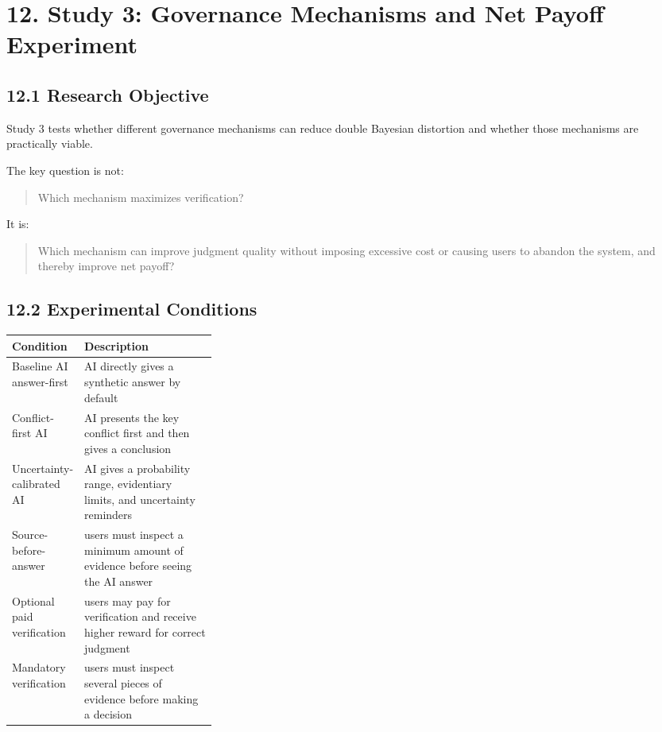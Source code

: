 \section*{12. Study 3: Governance Mechanisms and Net Payoff Experiment}

\subsection*{12.1 Research Objective}

Study 3 tests whether different governance mechanisms can reduce double Bayesian distortion and whether those mechanisms are practically viable.

The key question is not:
\begin{quote}
Which mechanism maximizes verification?
\end{quote}

It is:
\begin{quote}
Which mechanism can improve judgment quality without imposing excessive cost or causing users to abandon the system, and thereby improve net payoff?
\end{quote}

\subsection*{12.2 Experimental Conditions}

\begin{center}
\begin{tabularx}{\linewidth}{>{\raggedright\arraybackslash}p{0.3\linewidth} >{\raggedright\arraybackslash}X}
\toprule
\textbf{Condition} & \textbf{Description} \\
\midrule
Baseline AI answer-first & AI directly gives a synthetic answer by default \\
Conflict-first AI & AI presents the key conflict first and then gives a conclusion \\
Uncertainty-calibrated AI & AI gives a probability range, evidentiary limits, and uncertainty reminders \\
Source-before-answer & users must inspect a minimum amount of evidence before seeing the AI answer \\
Optional paid verification & users may pay for verification and receive higher reward for correct judgment \\
Mandatory verification & users must inspect several pieces of evidence before making a decision \\
\bottomrule
\end{tabularx}
\end{center}

